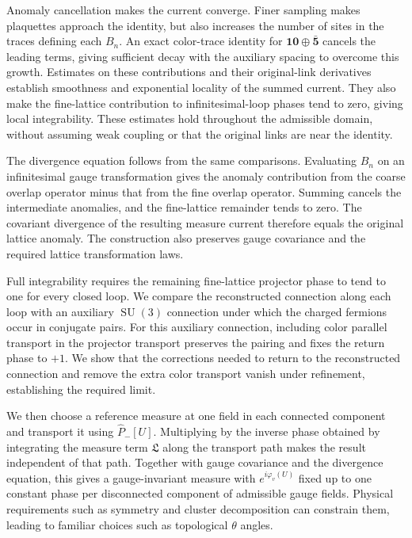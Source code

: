 \documentclass[11pt,a4paper]{article}
\theoremstyle{remark}
\DeclareMathOperator{\SU}{SU}
\begin{document}
Anomaly cancellation makes the current converge. Finer sampling makes plaquettes approach the identity, but also increases the number of sites in the traces defining each $B_n$. An exact color-trace identity for $\mathbf{10}\oplus\bar{\mathbf5}$ cancels the leading terms, giving sufficient decay with the auxiliary spacing to overcome this growth. Estimates on these contributions and their original-link derivatives establish smoothness and exponential locality of the summed current. They also make the fine-lattice contribution to infinitesimal-loop phases tend to zero, giving local integrability. These estimates hold throughout the admissible domain, without assuming weak coupling or that the original links are near the identity.

The divergence equation follows from the same comparisons. Evaluating $B_n$ on an infinitesimal gauge transformation gives the anomaly contribution from the coarse overlap operator minus that from the fine overlap operator. Summing cancels the intermediate anomalies, and the fine-lattice remainder tends to zero. The covariant divergence of the resulting measure current therefore equals the original lattice anomaly. The construction also preserves gauge covariance and the required lattice transformation laws.

Full integrability requires the remaining fine-lattice projector phase to tend to one for every closed loop. We compare the reconstructed connection along each loop with an auxiliary $\SU(3)$ connection under which the charged fermions occur in conjugate pairs. For this auxiliary connection, including color parallel transport in the projector transport preserves the pairing and fixes the return phase to $+1$. We show that the corrections needed to return to the reconstructed connection and remove the extra color transport vanish under refinement, establishing the required limit.

We then choose a reference measure at one field in each connected component and transport it using $\widehat P_-[U]$. Multiplying by the inverse phase obtained by integrating the measure term $\mathfrak L$ along the transport path makes the result independent of that path. Together with gauge covariance and the divergence equation, this gives a gauge-invariant measure with $e^{i\varphi_v(U)}$ fixed up to one constant phase per disconnected component of admissible gauge fields. Physical requirements such as symmetry and cluster decomposition can constrain them, leading to familiar choices such as topological $\theta$ angles.
\end{document}

